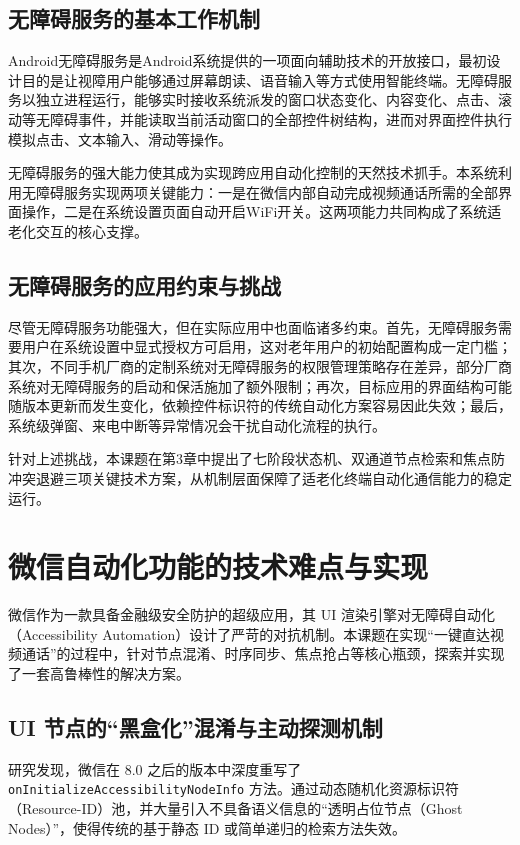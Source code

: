 \subsection{无障碍服务的基本工作机制}

Android无障碍服务是Android系统提供的一项面向辅助技术的开放接口，最初设计目的是让视障用户能够通过屏幕朗读、语音输入等方式使用智能终端。无障碍服务以独立进程运行，能够实时接收系统派发的窗口状态变化、内容变化、点击、滚动等无障碍事件，并能读取当前活动窗口的全部控件树结构，进而对界面控件执行模拟点击、文本输入、滑动等操作。

无障碍服务的强大能力使其成为实现跨应用自动化控制的天然技术抓手。本系统利用无障碍服务实现两项关键能力：一是在微信内部自动完成视频通话所需的全部界面操作，二是在系统设置页面自动开启WiFi开关。这两项能力共同构成了系统适老化交互的核心支撑。

\subsection{无障碍服务的应用约束与挑战}

尽管无障碍服务功能强大，但在实际应用中也面临诸多约束。首先，无障碍服务需要用户在系统设置中显式授权方可启用，这对老年用户的初始配置构成一定门槛；其次，不同手机厂商的定制系统对无障碍服务的权限管理策略存在差异，部分厂商系统对无障碍服务的启动和保活施加了额外限制；再次，目标应用的界面结构可能随版本更新而发生变化，依赖控件标识符的传统自动化方案容易因此失效；最后，系统级弹窗、来电中断等异常情况会干扰自动化流程的执行。

针对上述挑战，本课题在第3章中提出了七阶段状态机、双通道节点检索和焦点防冲突退避三项关键技术方案，从机制层面保障了适老化终端自动化通信能力的稳定运行。

\section{微信自动化功能的技术难点与实现}

微信作为一款具备金融级安全防护的超级应用，其 UI 渲染引擎对无障碍自动化（Accessibility Automation）设计了严苛的对抗机制。本课题在实现“一键直达视频通话”的过程中，针对节点混淆、时序同步、焦点抢占等核心瓶颈，探索并实现了一套高鲁棒性的解决方案。

\subsection{UI 节点的“黑盒化”混淆与主动探测机制}

研究发现，微信在 8.0 之后的版本中深度重写了 \texttt{onInitialize\allowbreak Accessibility\allowbreak NodeInfo} 方法。通过动态随机化资源标识符（Resource-ID）池，并大量引入不具备语义信息的“透明占位节点（Ghost Nodes）”，使得传统的基于静态 ID 或简单递归的检索方法失效。

